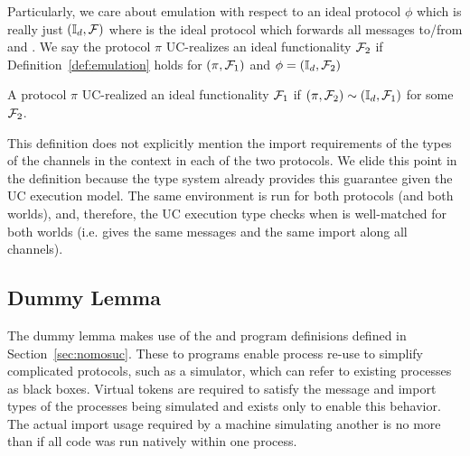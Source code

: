 Particularly, we care about emulation with respect to an ideal protocol $\phi$ which is really just $(\mathbb{I}_d, \mathcal{F})$ where \idealP is the ideal protocol which forwards all messages to/from \Environment and \F.
We say the protocol $\pi$ UC-realizes an ideal functionality $\mathcal{F}_2$ if Definition~\ref{def:emulation} holds for $(\pi, \mathcal{F}_1)$ and  $\phi = (\mathbb{I}_d, \mathcal{F}_2)$

\begin{definition}[UC-Realize]
A protocol $\pi$ UC-realized an ideal functionality $\mathcal{F}_1$ if $(\pi, \mathcal{F}_2) \sim (\mathbb{I}_d, \mathcal{F}_1)$ for some $\mathcal{F}_2$.
\end{definition}

This definition does not explicitly mention the import requirements of the types of the channels in the context in each of the two protocols. 
We elide this point in the definition because the type system already provides this guarantee given the UC execution model.
The same environment \Environment is run for both protocols (and both worlds), and, therefore, the UC execution type checks when \Environment is well-matched for both worlds (i.e. gives the same messages and the same import along all channels).

%

\subsection{Dummy Lemma}
The dummy lemma makes use of the  and  program definisions defined in Section~\ref{sec:nomosuc}.
These to programs enable process re-use to simplify complicated protocols, such as a simulator, which can refer to existing processes as black boxes.
Virtual tokens are required to satisfy the message and import types of the processes being simulated and exists only to enable this behavior.
The actual import usage required by a machine simulating another is no more than if all code was run natively within one process.

